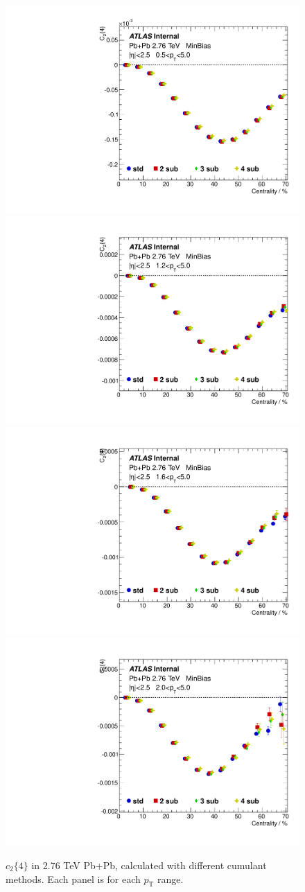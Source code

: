 \begin{figure}[H]
\centering
\includegraphics[width=.245\linewidth]{figs/sec_appendix/PbPb276/PbPb276_mtd_Har2_Pt0.pdf}
\includegraphics[width=.245\linewidth]{figs/sec_appendix/PbPb276/PbPb276_mtd_Har2_Pt2.pdf}
\includegraphics[width=.245\linewidth]{figs/sec_appendix/PbPb276/PbPb276_mtd_Har2_Pt4.pdf}
\includegraphics[width=.245\linewidth]{figs/sec_appendix/PbPb276/PbPb276_mtd_Har2_Pt6.pdf}
\caption{$c_2\{4\}$ in 2.76 TeV Pb+Pb, calculated with different cumulant methods. Each panel is for each $p_\text{T}$ range.}
\label{fig:PbPb276_mtd_v2}
\end{figure}

